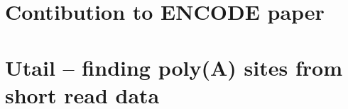 \documentclass[]{ntnuthesis}
\begin{document}


%

%


\chapter{Contibution to ENCODE paper}



\appendix
\chapter{Utail -- finding poly(A) sites from short read data}


\end{document}
